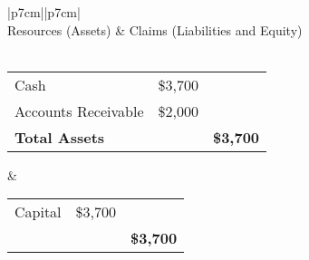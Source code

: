 \newpage

\begin{center}
\begin{tabular}{ |p{7cm}||p{7cm}|  }
    \hline
       \\
    \hline 
    Resources (Assets) & Claims (Liabilities and Equity) \\ \\ 
    \begin{tabular}{p{3cm} r r}
        Cash & \$3,700 &  \\
        Accounts Receivable & \$2,000 \\
        
        \textbf{Total Assets} &  & \textbf{\$3,700}
    \end{tabular}
    &
    \begin{tabular}{p{3cm} r r}
        Capital & \$3,700 &  \\
        
        &  & \textbf{\$3,700}
    \end{tabular}
    \\
    \hline\end{tabular}
\end{center}





